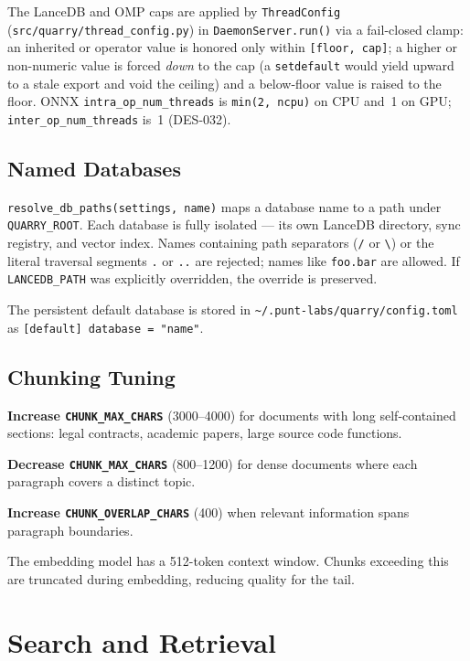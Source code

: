 \documentclass[a4paper,10pt]{article}
\newcommand{\modpath}[1]{\texttt{src/quarry/#1}}
\begin{document}
The LanceDB and OMP caps are applied by \texttt{ThreadConfig}
(\modpath{thread\_config.py}) in \texttt{DaemonServer.run()} via a
fail-closed clamp: an inherited or operator value is honored only within
\texttt{[floor, cap]}; a higher or non-numeric value is forced \emph{down}
to the cap (a \texttt{setdefault} would yield upward to a stale export and
void the ceiling) and a below-floor value is raised to the floor.  ONNX
\texttt{intra\_op\_num\_threads} is \texttt{min(2, ncpu)} on CPU and~1 on
GPU; \texttt{inter\_op\_num\_threads} is~1 (DES-032).

\subsection{Named Databases}

\texttt{resolve\_db\_paths(settings, name)} maps a database name to a
path under \texttt{QUARRY\_ROOT}.  Each database is fully isolated ---
its own LanceDB directory, sync registry, and vector index.  Names containing path separators (\texttt{/} or
\texttt{\textbackslash}) or the literal traversal segments \texttt{.}
or \texttt{..} are rejected; names like \texttt{foo.bar} are allowed.
If \texttt{LANCEDB\_PATH} was explicitly overridden, the override is
preserved.

The persistent default database is stored in
\texttt{\~{}/.punt-labs/quarry/config.toml} as \texttt{[default] database = "name"}.

\subsection{Chunking Tuning}

\textbf{Increase \texttt{CHUNK\_MAX\_CHARS}} (3000--4000) for documents
with long self-contained sections: legal contracts, academic papers,
large source code functions.

\textbf{Decrease \texttt{CHUNK\_MAX\_CHARS}} (800--1200) for dense
documents where each paragraph covers a distinct topic.

\textbf{Increase \texttt{CHUNK\_OVERLAP\_CHARS}} (400) when relevant
information spans paragraph boundaries.

The embedding model has a 512-token context window.  Chunks exceeding
this are truncated during embedding, reducing quality for the tail.

\section{Search and Retrieval}
\end{document}
